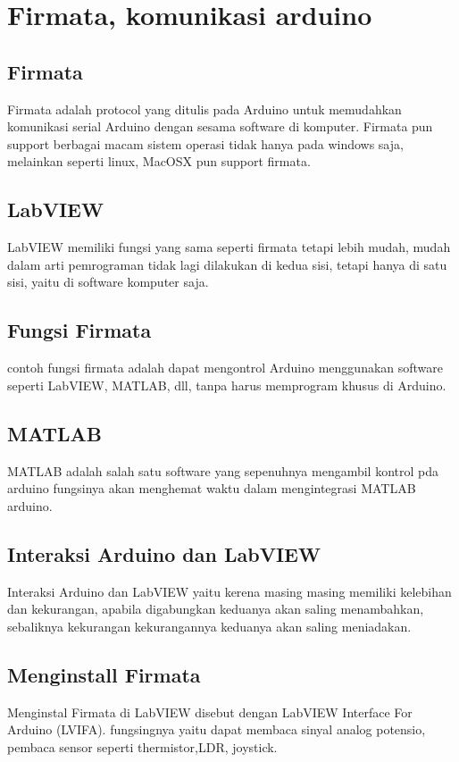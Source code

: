 
\section{Firmata, komunikasi arduino}

	\subsection{Firmata}
	Firmata adalah protocol yang ditulis pada Arduino untuk memudahkan komunikasi serial Arduino dengan sesama software di komputer. Firmata pun support berbagai macam sistem operasi tidak hanya pada windows saja, melainkan seperti linux, MacOSX pun support firmata.
	
	
	\subsection{LabVIEW}
	LabVIEW memiliki fungsi yang sama seperti firmata tetapi lebih mudah, mudah dalam arti pemrograman tidak lagi dilakukan di kedua sisi,
	tetapi hanya di satu sisi, yaitu di software komputer saja.
	
	\subsection{Fungsi Firmata}
	contoh fungsi firmata adalah dapat mengontrol Arduino menggunakan software seperti LabVIEW, MATLAB, dll, tanpa harus memprogram khusus di Arduino.
	
	\subsection{MATLAB}
	MATLAB adalah salah satu software yang sepenuhnya mengambil kontrol pda arduino fungsinya akan menghemat waktu dalam mengintegrasi MATLAB arduino.
	
	\subsection{Interaksi Arduino dan LabVIEW}
	Interaksi Arduino dan LabVIEW yaitu kerena masing masing memiliki kelebihan dan kekurangan, apabila digabungkan keduanya akan saling menambahkan,
	sebaliknya kekurangan kekurangannya keduanya akan saling meniadakan.
	
	\subsection{Menginstall Firmata}
	Menginstal Firmata di LabVIEW disebut dengan LabVIEW Interface For Arduino (LVIFA). fungsingnya yaitu dapat membaca sinyal analog potensio,
	pembaca sensor seperti thermistor,LDR, joystick.